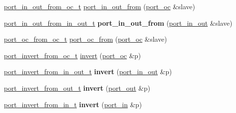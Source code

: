 \textbf{ }\par
\begin{DoxyCompactItemize}
\item 
\hyperlink{classhwlib_1_1port__in__out__from__oc__t}{port\+\_\+in\+\_\+out\+\_\+from\+\_\+oc\+\_\+t} \hyperlink{namespacehwlib_acbdd725ccffcd89167303457d733ecc0}{port\+\_\+in\+\_\+out\+\_\+from} (\hyperlink{classhwlib_1_1port__oc}{port\+\_\+oc} \&slave)
\item 
\mbox{\label{namespacehwlib_a1d4aba6bf66bf7c1d5e992bf9175a866}} 
\hyperlink{classhwlib_1_1port__in__out__from__in__out__t}{port\+\_\+in\+\_\+out\+\_\+from\+\_\+in\+\_\+out\+\_\+t} {\bfseries port\+\_\+in\+\_\+out\+\_\+from} (\hyperlink{classhwlib_1_1port__in__out}{port\+\_\+in\+\_\+out} \&slave)
\end{DoxyCompactItemize}

\textbf{ }\par
\begin{DoxyCompactItemize}
\item 
\hyperlink{classhwlib_1_1port__oc__from__oc__t}{port\+\_\+oc\+\_\+from\+\_\+oc\+\_\+t} \hyperlink{namespacehwlib_a29cc3710580f0fbeeb39dffe530bd007}{port\+\_\+oc\+\_\+from} (\hyperlink{classhwlib_1_1port__oc}{port\+\_\+oc} \&slave)
\end{DoxyCompactItemize}

\textbf{ }\par
\begin{DoxyCompactItemize}
\item 
\hyperlink{classhwlib_1_1port__invert__from__oc__t}{port\+\_\+invert\+\_\+from\+\_\+oc\+\_\+t} \hyperlink{namespacehwlib_a5c1e15f25a48422bbb39fa1aba2c27e9}{invert} (\hyperlink{classhwlib_1_1port__oc}{port\+\_\+oc} \&p)
\item 
\mbox{\label{namespacehwlib_aba7a64c2cf66dd80210df6e99f6a6277}} 
\hyperlink{classhwlib_1_1port__invert__from__in__out__t}{port\+\_\+invert\+\_\+from\+\_\+in\+\_\+out\+\_\+t} {\bfseries invert} (\hyperlink{classhwlib_1_1port__in__out}{port\+\_\+in\+\_\+out} \&p)
\item 
\mbox{\label{namespacehwlib_a8a434f5c722817e6e22fb311fe1d8916}} 
\hyperlink{classhwlib_1_1port__invert__from__out__t}{port\+\_\+invert\+\_\+from\+\_\+out\+\_\+t} {\bfseries invert} (\hyperlink{classhwlib_1_1port__out}{port\+\_\+out} \&p)
\item 
\mbox{\label{namespacehwlib_a362d1218a89beb2caa746fec5016aa8b}} 
\hyperlink{classhwlib_1_1port__invert__from__in__t}{port\+\_\+invert\+\_\+from\+\_\+in\+\_\+t} {\bfseries invert} (\hyperlink{classhwlib_1_1port__in}{port\+\_\+in} \&p)
\end{DoxyCompactItemize}

